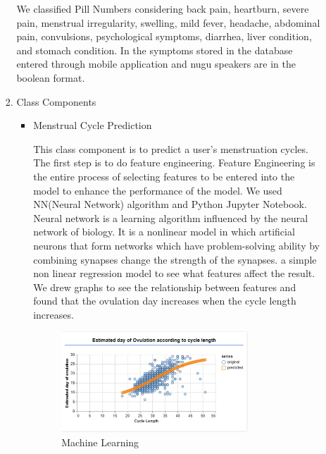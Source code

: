 \documentclass[conference]{IEEEtran}
\begin{document}
\begin{itemize}
\begin{enumerate}
\begin{enumerate}
             \setlength{\parindent}{2ex} We classified Pill Numbers considering back pain, heartburn, severe pain, menstrual irregularity, swelling, mild fever, headache, abdominal pain, convulsions, psychological symptoms, diarrhea, liver condition, and stomach condition. In the symptoms stored in the database entered through mobile application and nugu speakers are in the boolean format.
            \item Class Components
            \begin{itemize}
                \item Menstrual Cycle Prediction
                
                \setlength{\parindent}{2ex} This class component is to predict a user's menstruation cycles. The first step is to do feature engineering. Feature Engineering is the entire process of selecting features to be entered into the model to enhance the performance of the model. We used NN(Neural Network) algorithm and Python Jupyter Notebook. Neural network is a learning algorithm influenced by the neural network of biology. It is a nonlinear model in which artificial neurons that form networks which have problem-solving ability by combining synapses change the strength of the synapses. a simple non linear regression model to see what features affect the result. We drew graphs to see the relationship between features and found that the ovulation day increases when the cycle length increases. 
                 \begin{figure}[ht]
                 \includegraphics[width=7cm, center]{machineclass1.png}
                 \caption{Machine Learning}
                 \label{fig47}
                 \end{figure}
                 

\end{itemize}
\end{enumerate}
\end{enumerate}
\end{itemize}
\end{document}
